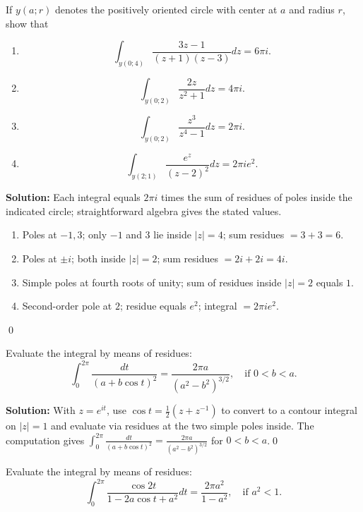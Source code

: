 \begin{problembox}
If \( y(a; r) \) denotes the positively oriented circle with center at \( a \) and radius \( r \), show that
\begin{enumerate}[label=(\alph*)]
\item \[ \int_{y(0;4)} \frac{3z - 1}{(z + 1)(z - 3)} dz = 6\pi i. \]
\item \[ \int_{y(0;2)} \frac{2z}{z^2 + 1} dz = 4\pi i. \]
\item \[ \int_{y(0;2)} \frac{z^3}{z^4 - 1} dz = 2\pi i. \]
\item \[ \int_{y(2;1)} \frac{e^z}{(z - 2)^2} dz = 2\pi ie^2. \]
\end{enumerate}
\end{problembox}

\noindent\textbf{Solution:}
Each integral equals $2\pi i$ times the sum of residues of poles inside the indicated circle; straightforward algebra gives the stated values.
\begin{enumerate}[label=(\alph*)]
\item Poles at $-1,3$; only $-1$ and $3$ lie inside $|z|=4$; sum residues $=3+3=6$.
\item Poles at $\pm i$; both inside $|z|=2$; sum residues $=2i+2i=4i$.
\item Simple poles at fourth roots of unity; sum of residues inside $|z|=2$ equals $1$.
\item Second-order pole at $2$; residue equals $e^2$; integral $=2\pi i e^2$.
\end{enumerate}\qed


\begin{problembox}
Evaluate the integral by means of residues:
\[ \int_0^{2\pi} \frac{dt}{(a + b \cos t)^2} = \frac{2\pi a}{(a^2 - b^2)^{3/2}}, \quad \text{if } 0 < b < a. \]
\end{problembox}

\noindent\textbf{Solution:}
With $z=e^{it}$, use $\cos t=\tfrac12(z+z^{-1})$ to convert to a contour integral on $|z|=1$ and evaluate via residues at the two simple poles inside. The computation gives $\int_0^{2\pi}\frac{dt}{(a+b\cos t)^2}=\frac{2\pi a}{(a^2-b^2)^{3/2}}$ for $0<b<a$.\qed


\begin{problembox}
Evaluate the integral by means of residues:
\[ \int_0^{2\pi} \frac{\cos 2t}{1 - 2a \cos t + a^2} dt = \frac{2\pi a^2}{1 - a^2}, \quad \text{if } a^2 < 1. \]
\end{problembox}

